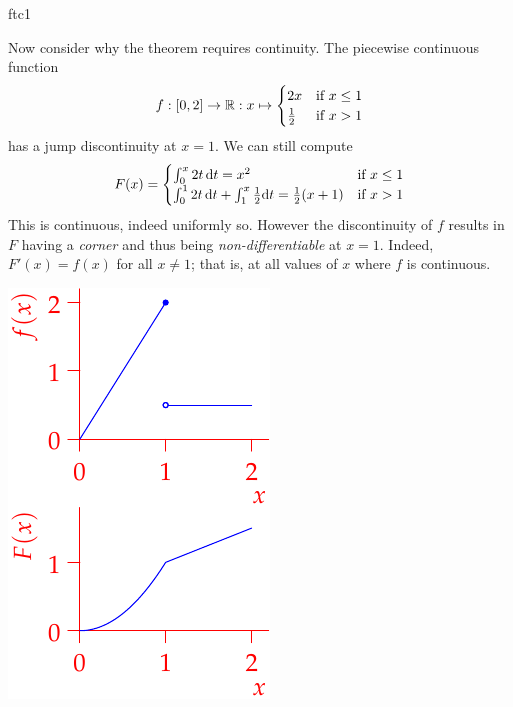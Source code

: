 \begin{examples}{}{ftc1}
\begin{enumerate}
  \begin{minipage}[t]{0.7\linewidth}\vspace{0pt}
  \item\label{ex:ftcdiscont} Now consider why the theorem requires continuity. The piecewise continuous function
  \[f:[0,2]\to\mathbb{R}:x\mapsto\begin{cases}
  2x&\text{if }x\le 1\\
  \frac 12&\text{if }x>1
  \end{cases}\]
  has a jump discontinuity at $x=1$. We can still compute
  \[F(x)=\begin{cases}
  \int_0^x 2t\,{\mathrm{d} t}=x^2&\text{if }x\le 1\\
  \int_0^12t\,{\mathrm{d} t}+\int_1^x\frac 12{\mathrm{d} t}=\frac 12(x+1)&\text{if }x>1
  \end{cases}\]
  This is continuous, indeed uniformly so. However the discontinuity of $f$ results in $F$ having a \emph{corner} and thus being \emph{non-differentiable} at $x=1$. Indeed, $F'(x)=f(x)$ for all $x\neq 1$; that is, at all values of $x$ where $f$ is continuous.
  \end{minipage}\begin{minipage}[t]{0.3\linewidth}\vspace{0pt}
  \flushright\includegraphics{ftc1}
  \end{minipage}
\end{enumerate}
\end{examples}
\vfil\goodbreak

